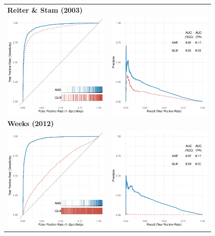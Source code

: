 \begin{figure}
	\centering   
	\begin{tabular}{cc}
		\multicolumn{2}{l}{\textbf{\tiny{Reiter \& Stam (2003)}}} \\
		\includegraphics[width=.4\textwidth]{graphics/reiter_stam_roc_outSample.pdf} & 
		\includegraphics[width=.4\textwidth]{graphics/reiter_stam_pr_outSample.pdf} \\
		\multicolumn{2}{l}{\textbf{\tiny{Weeks (2012)}}} \\
		\includegraphics[width=.4\textwidth]{graphics/weeks_roc_outSample.pdf} & 
		\includegraphics[width=.4\textwidth]{graphics/weeks_pr_outSample.pdf} \\

\end{tabular}
\end{figure}
